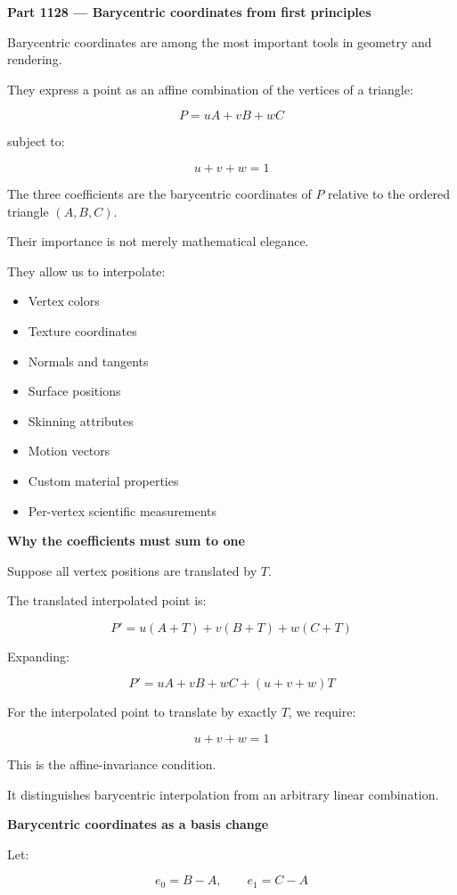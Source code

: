 \textbf{Part 1128 --- Barycentric coordinates from first principles}

Barycentric coordinates are among the most important tools in geometry and rendering.

They express a point as an affine combination of the vertices of a triangle:

\[
\boxed{ P=uA+vB+wC }
\]

subject to:

\[
\boxed{u+v+w=1}
\]

The three coefficients are the barycentric coordinates of \(P\) relative to the ordered triangle \((A,B,C)\).

Their importance is not merely mathematical elegance.

They allow us to interpolate:

\begin{itemize}
\tightlist
\item
  Vertex colors
\item
  Texture coordinates
\item
  Normals and tangents
\item
  Surface positions
\item
  Skinning attributes
\item
  Motion vectors
\item
  Custom material properties
\item
  Per-vertex scientific measurements
\end{itemize}

\textbf{Why the coefficients must sum to one}

Suppose all vertex positions are translated by \(T\).

The translated interpolated point is:

\[
P'=u(A+T)+v(B+T)+w(C+T)
\]

Expanding:

\[
P'=uA+vB+wC+(u+v+w)T
\]

For the interpolated point to translate by exactly \(T\), we require:

\[
u+v+w=1
\]

This is the affine-invariance condition.

It distinguishes barycentric interpolation from an arbitrary linear combination.

\textbf{Barycentric coordinates as a basis change}

Let:

\[
e_0=B-A,\qquad e_1=C-A
\]

